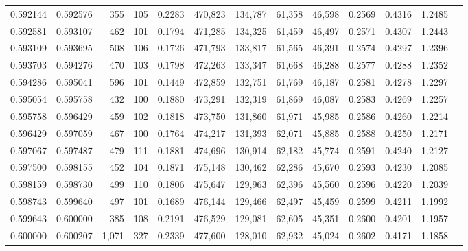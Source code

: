 \begin{tabular}{rrrrrrrrrrrrr}
0.592144 & 0.592576 &    355 &   105 &                                     0.2283 & 470,823 & 134,787 &  61,358 &  46,598 & 0.2569 & 0.4316 & 1.2485 \\
0.592581 & 0.593107 &    462 &   101 &                                     0.1794 & 471,285 & 134,325 &  61,459 &  46,497 & 0.2571 & 0.4307 & 1.2443 \\
0.593109 & 0.593695 &    508 &   106 &                                     0.1726 & 471,793 & 133,817 &  61,565 &  46,391 & 0.2574 & 0.4297 & 1.2396 \\
0.593703 & 0.594276 &    470 &   103 &                                     0.1798 & 472,263 & 133,347 &  61,668 &  46,288 & 0.2577 & 0.4288 & 1.2352 \\
0.594286 & 0.595041 &    596 &   101 &                                     0.1449 & 472,859 & 132,751 &  61,769 &  46,187 & 0.2581 & 0.4278 & 1.2297 \\
0.595054 & 0.595758 &    432 &   100 &                                     0.1880 & 473,291 & 132,319 &  61,869 &  46,087 & 0.2583 & 0.4269 & 1.2257 \\
0.595758 & 0.596429 &    459 &   102 &                                     0.1818 & 473,750 & 131,860 &  61,971 &  45,985 & 0.2586 & 0.4260 & 1.2214 \\
0.596429 & 0.597059 &    467 &   100 &                                     0.1764 & 474,217 & 131,393 &  62,071 &  45,885 & 0.2588 & 0.4250 & 1.2171 \\
0.597067 & 0.597487 &    479 &   111 &                                     0.1881 & 474,696 & 130,914 &  62,182 &  45,774 & 0.2591 & 0.4240 & 1.2127 \\
0.597500 & 0.598155 &    452 &   104 &                                     0.1871 & 475,148 & 130,462 &  62,286 &  45,670 & 0.2593 & 0.4230 & 1.2085 \\
0.598159 & 0.598730 &    499 &   110 &                                     0.1806 & 475,647 & 129,963 &  62,396 &  45,560 & 0.2596 & 0.4220 & 1.2039 \\
0.598743 & 0.599640 &    497 &   101 &                                     0.1689 & 476,144 & 129,466 &  62,497 &  45,459 & 0.2599 & 0.4211 & 1.1992 \\
0.599643 & 0.600000 &    385 &   108 &                                     0.2191 & 476,529 & 129,081 &  62,605 &  45,351 & 0.2600 & 0.4201 & 1.1957 \\
0.600000 & 0.600207 &  1,071 &   327 &                                     0.2339 & 477,600 & 128,010 &  62,932 &  45,024 & 0.2602 & 0.4171 & 1.1858 \\

\end{tabular}
